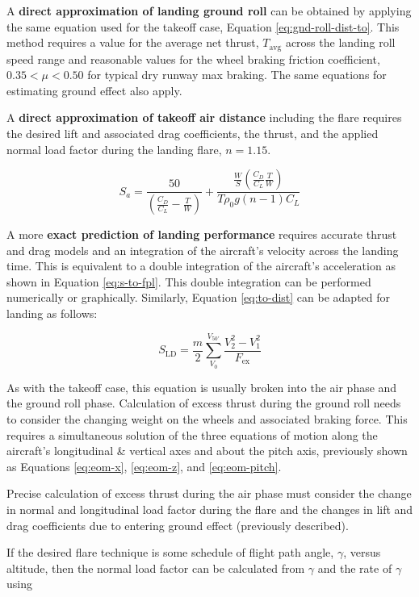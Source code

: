\documentclass[
]{book}
\begin{document}
A \textbf{direct approximation of landing ground roll} can be obtained by applying the
same equation used for the takeoff case, Equation \eqref{eq:gnd-roll-dist-to}. This method requires a value for
the average net thrust, \(T_{\text{avg}}\) across the landing roll speed range and
reasonable values for the wheel braking friction coefficient,
\(0.35 < \mu < 0.50\) for typical dry runway max braking. The same equations
for estimating ground effect also apply.

A \textbf{direct approximation of takeoff air distance} including the flare requires
the desired lift and associated drag coefficients, the thrust, and the applied
normal load factor during the landing flare, \(n = 1.15\).

\[
S_a = \frac{50}{\left( \frac{C_D}{C_L} - \frac{T}{W} \right)} + \frac{ \frac{W}{S} \left( \frac{C_D}{C_L} \frac{T}{W} \right) }{T \rho_0  g \left( n - 1 \right) C_L }
\label{eq:approx-air-dist-land}
\]

A more \textbf{exact prediction of landing performance} requires accurate thrust and
drag models and an integration of the aircraft's velocity across the landing
time. This is equivalent to a double integration of the aircraft's acceleration
as shown in Equation \eqref{eq:s-to-fpl}. This double integration can be performed
numerically or graphically. Similarly, Equation \eqref{eq:to-dist} can be adapted
for landing as follows:

\[
S_{\mathrm{LD}} = \frac{m}{2} \sum_{V_0}^{V_{50'}} \frac{V^2_2 - V^2_1}{F_{\text{ex}}}
\label{eq:land-dist}
\]

As with the takeoff case, this equation is usually broken into the air phase and
the ground roll phase. Calculation of excess thrust during the ground roll needs
to consider the changing weight on the wheels and associated braking force. This
requires a simultaneous solution of the three equations of motion along the
aircraft's longitudinal \& vertical axes and about the pitch axis, previously
shown as Equations \eqref{eq:eom-x}, \eqref{eq:eom-z}, and \eqref{eq:eom-pitch}.

Precise calculation of excess thrust during the air phase must consider the
change in normal and longitudinal load factor during the flare and the changes
in lift and drag coefficients due to entering ground effect (previously
described).

If the desired flare technique is some schedule of flight path angle,
\(\gamma\), versus altitude, then the normal load factor can be calculated from
\(\gamma\) and the rate of \(\gamma\) using
\end{document}
